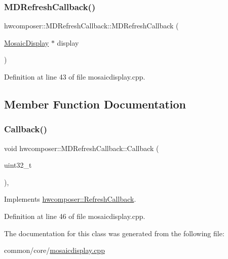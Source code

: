 \subsubsection{\texorpdfstring{M\+D\+Refresh\+Callback()}{MDRefreshCallback()}}
{\footnotesize\ttfamily hwcomposer\+::\+M\+D\+Refresh\+Callback\+::\+M\+D\+Refresh\+Callback (\begin{DoxyParamCaption}\item[{\mbox{\hyperlink{classhwcomposer_1_1MosaicDisplay}{Mosaic\+Display}} $\ast$}]{display }\end{DoxyParamCaption})\hspace{0.3cm}{\ttfamily [inline]}}



Definition at line 43 of file mosaicdisplay.\+cpp.


\begin{DoxyCode}{0}
\end{DoxyCode}


\subsection{Member Function Documentation}
\mbox{\label{classhwcomposer_1_1MDRefreshCallback_a398cbe9e48e0b40eb73588d772da6833}} 
\subsubsection{\texorpdfstring{Callback()}{Callback()}}
{\footnotesize\ttfamily void hwcomposer\+::\+M\+D\+Refresh\+Callback\+::\+Callback (\begin{DoxyParamCaption}\item[{uint32\+\_\+t}]{ }\end{DoxyParamCaption})\hspace{0.3cm}{\ttfamily [inline]}, {\ttfamily [virtual]}}



Implements \mbox{\hyperlink{classhwcomposer_1_1RefreshCallback_a5637a4b1437bbf8c93d8356addbf7c87}{hwcomposer\+::\+Refresh\+Callback}}.



Definition at line 46 of file mosaicdisplay.\+cpp.


\begin{DoxyCode}{0}
\end{DoxyCode}


The documentation for this class was generated from the following file\+:\begin{DoxyCompactItemize}
\item 
common/core/\mbox{\hyperlink{mosaicdisplay_8cpp}{mosaicdisplay.\+cpp}}\end{DoxyCompactItemize}
